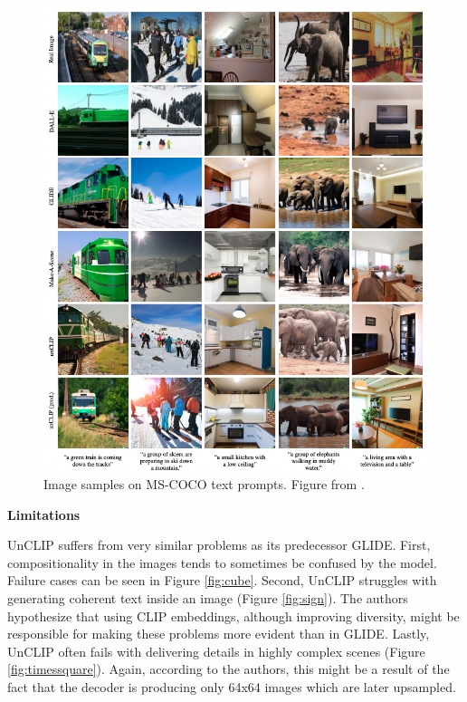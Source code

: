 \documentclass[
]{krantz}
\begin{document}
\begin{figure}

{\centering \includegraphics[width=1\linewidth]{figures/02-02-text-2-img/unclipimages} 

}

\caption{Image samples on MS-COCO text prompts. Figure from \citet{DALLE2}.}\label{fig:unclipimages}
\end{figure}



\textbf{Limitations}

UnCLIP suffers from very similar problems as its predecessor GLIDE. First, compositionality in the images tends to sometimes be confused by the model. Failure cases can be seen in Figure \ref{fig:cube}. Second, UnCLIP struggles with generating coherent text inside an image (Figure \ref{fig:sign}). The authors hypothesize that using CLIP embeddings, although improving diversity, might be responsible for making these problems more evident than in GLIDE. Lastly, UnCLIP often fails with delivering details in highly complex scenes (Figure \ref{fig:timessquare}). Again, according to the authors, this might be a result of the fact that the decoder is producing only 64x64 images which are later upsampled.
\end{document}
